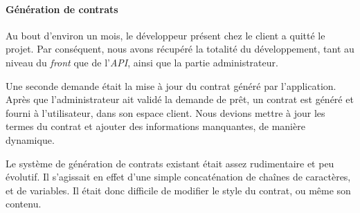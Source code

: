 \documentclass[12pt,a4paper]{article}
\begin{document}
  \paragraph{Génération de contrats}\label{guxe9nuxe9ration-de-contrats}

  Au bout d'environ un mois, le développeur présent chez le client a
  quitté le projet. Par conséquent, nous avons récupéré la totalité du
  développement, tant au niveau du \emph{front} que de l'\emph{API}, ainsi
  que la partie administrateur.

  \bigskip

  Une seconde demande était la mise à jour du contrat généré par
  l'application. Après que l'administrateur ait validé la demande de prêt,
  un contrat est généré et fourni à l'utilisateur, dans son espace client.
  Nous devions mettre à jour les termes du contrat et ajouter des
  informations manquantes, de manière dynamique.

  \bigskip

  Le système de génération de contrats existant était assez rudimentaire
  et peu évolutif. Il s'agissait en effet d'une simple concaténation de
  chaînes de caractères, et de variables. Il était donc difficile de
  modifier le style du contrat, ou même son contenu.
\end{document}
